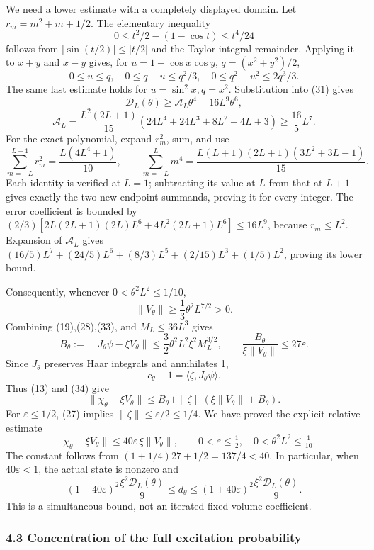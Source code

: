 \documentclass[
  11pt,
]{article}
\begin{document}
We need a lower estimate with a completely displayed domain. Let
\(r_m=m^2+m+1/2\). The elementary inequality \[
 0\le t^2/2-(1-\cos t)\le t^4/24
\] follows from \(|\sin(t/2)|\le|t/2|\) and the Taylor integral
remainder. Applying it to \(x+y\) and \(x-y\) gives, for
\(u=1-\cos x\cos y\), \(q=(x^2+y^2)/2\), \[
 0\le u\le q,\quad 0\le q-u\le q^2/3,
 \quad0\le q^2-u^2\le2q^3/3.
\] The same last estimate holds for \(u=\sin^2x,q=x^2\). Substitution
into (31) gives \[
 \mathcal D_L(\theta)\ge\mathcal A_L\theta^4-16L^9\theta^6,
\] \[
 \mathcal A_L=
 \frac{L^2(2L+1)}{15}(24L^4+24L^3+8L^2-4L+3)
 \ge\frac{16}{5}L^7.
\tag{32}
\] For the exact polynomial, expand \(r_m^2\), sum, and use \[
 \sum_{m=-L}^{L-1}r_m^2=\frac{L(4L^4+1)}{10},\qquad
 \sum_{m=-L}^Lm^4=\frac{L(L+1)(2L+1)(3L^2+3L-1)}{15}.
\] Each identity is verified at \(L=1\); subtracting its value at \(L\)
from that at \(L+1\) gives exactly the two new endpoint summands,
proving it for every integer. The error coefficient is bounded by
\((2/3)[2L(2L+1)(2L)L^6+4L^2(2L+1)L^6]\le16L^9\), because
\(r_m\le L^2\). Expansion of \(\mathcal A_L\) gives
\((16/5)L^7+(24/5)L^6+(8/3)L^5+(2/15)L^3+(1/5)L^2\), proving its lower
bound.

Consequently, whenever \(0<\theta^2L^2\le1/10\), \[
 \|V_\theta\|\ge\frac13\theta^2L^{7/2}>0.
\tag{33}
\] Combining (19),(28),(33), and \(M_L\le36L^3\) gives \[
 B_\theta:=\|J_\theta\psi-\xi V_\theta\|
 \le\frac32\theta^2L^2\xi^2M_L^{3/2},
 \qquad\frac{B_\theta}{\xi\|V_\theta\|}\le27\varepsilon.
\tag{34}
\] Since \(J_\theta\) preserves Haar integrals and annihilates 1, \[
 c_\theta-1=\langle\zeta,J_\theta\psi\rangle.
\] Thus (13) and (34) give \[
 \|\chi_\theta-\xi V_\theta\|
 \le B_\theta+\|\zeta\|(\xi\|V_\theta\|+B_\theta).
\] For \(\varepsilon\le1/2\), (27) implies
\(\|\zeta\|\le\varepsilon/2\le1/4\). We have proved the explicit
relative estimate \[
 \boxed{\quad
 \|\chi_\theta-\xi V_\theta\|\le
 40\varepsilon\,\xi\|V_\theta\|,
 \qquad 0<\varepsilon\le\tfrac12,
 \quad0<\theta^2L^2\le\tfrac1{10}.
 \quad}
\tag{35}
\] The constant follows from \((1+1/4)27+1/2=137/4<40\). In particular,
when \(40\varepsilon<1\), the actual state is nonzero and \[
 (1-40\varepsilon)^2\frac{\xi^2\mathcal D_L(\theta)}9
 \le d_\theta\le
 (1+40\varepsilon)^2\frac{\xi^2\mathcal D_L(\theta)}9.
\tag{36}
\] This is a simultaneous bound, not an iterated fixed-volume
coefficient.

\subsubsection{4.3 Concentration of the full excitation
probability}\label{concentration-of-the-full-excitation-probability}
\end{document}

